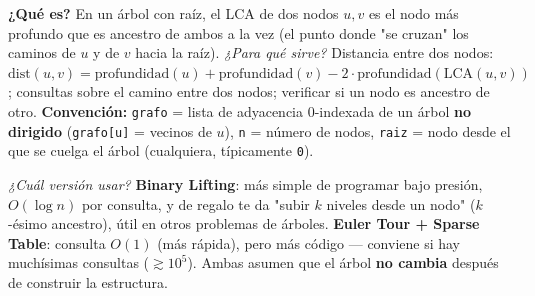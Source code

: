 \textbf{¿Qué es?} En un árbol con raíz, el LCA de dos nodos \(u,v\) es el nodo más profundo que es ancestro de ambos a la vez (el punto donde "se cruzan" los caminos de \(u\) y de \(v\) hacia la raíz). \textit{¿Para qué sirve?} Distancia entre dos nodos: \(\text{dist}(u,v) = \text{profundidad}(u)+\text{profundidad}(v)-2\cdot\text{profundidad}(\text{LCA}(u,v))\); consultas sobre el camino entre dos nodos; verificar si un nodo es ancestro de otro. \textbf{Convención:} \texttt{grafo} = lista de adyacencia 0-indexada de un árbol \textbf{no dirigido} (\texttt{grafo[u]} = vecinos de \(u\)), \texttt{n} = número de nodos, \texttt{raiz} = nodo desde el que se cuelga el árbol (cualquiera, típicamente \texttt{0}).

\textit{¿Cuál versión usar?} \textbf{Binary Lifting}: más simple de programar bajo presión, \(O(\log n)\) por consulta, y de regalo te da "subir \(k\) niveles desde un nodo" (\(k\)-ésimo ancestro), útil en otros problemas de árboles. \textbf{Euler Tour + Sparse Table}: consulta \(O(1)\) (más rápida), pero más código — conviene si hay muchísimas consultas (\(\gtrsim 10^5\)). Ambas asumen que el árbol \textbf{no cambia} después de construir la estructura.
